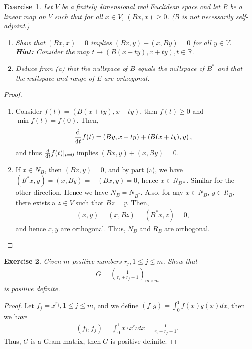 \documentclass[11pt]{book}
\newtheorem{exercise}{Exercise}[section]
\theoremstyle{definition}
\numberwithin{equation}{chapter}
\begin{document}
\begin{exercise}
Let $V$ be a finitely dimensional real Euclidean space and let $B$ be a linear map on $V$ such that for all $x \in V$, $(Bx,x) \geq 0$. ($B$ is not necessarily self-adjoint.)
\begin{enumerate}[label=(\alph*)]
    \item Show that $(Bx, x) = 0$ implies $(Bx, y) + (x, By) = 0$ for all $y \in V$. {\bf Hint:} Consider the map $t \mapsto (B(x+ty), x+ty), t \in \mathbb{R}$.
    
    \item Deduce from (a) that the nullspace of $B$ equals the nullspace of $B^*$ and that the nullspace and range of $B$ are orthogonal.
\end{enumerate}
\end{exercise}
\begin{proof}
~\begin{enumerate}[label=(\alph*)]
    \item Consider $f(t) = (B(x+ty), x+ty)$, then $f(t) \geq 0$ and $\min f(t) = f(0)$. Then, 
    \begin{align*}
        \dv{}{t} f(t) = \left(By, x+ty\right) + \left(B(x+ty), y\right),
    \end{align*}
    and thus $\dv{}{t} f(t)|_{t=0}$ implies $(Bx, y) + (x, By) = 0$.
    
    \item If $x \in N_B$, then $(Bx,y) = 0$, and by part (a), we have $(B^*x,y) = (x,By) = - (Bx,y) = 0$, hence $x \in N_{B*}$. Similar for the other direction. Hence we have $N_B = N_{B^*}$. Also, for any $x \in N_B$, $y \in R_B$, there exists a $z \in V$ such that $Bz = y$. Then, 
    \begin{align*}
        (x,y) = (x, Bz) = (B^*x, z) = 0,
    \end{align*}
    and hence $x, y$ are orthogonal. Thus, $N_B$ and $R_B$ are orthogonal.
\end{enumerate}
\end{proof}

\medskip

\begin{exercise}
Given $m$ positive numbers $r_j, 1\leq j \leq m$. Show that 
\begin{align*}
    G = \left(\frac{1}{r_i + r_j + 1}\right)_{m\times m}
\end{align*}
is positive definite.
\end{exercise}
\begin{proof}
Let $f_j = x^{r_j}, 1\leq j \leq m$, and we define $(f,g) = \int^1_0 f(x)g(x)dx$, then we have 
\begin{align*}
    (f_i, f_j) = \int^1_0 x^{r_i}x^{r_j}dx = \frac{1}{r_i + r_j + 1}.
\end{align*}
Thus, $G$ is a Gram matrix, then $G$ is positive definite.
\end{proof}
\end{document}
